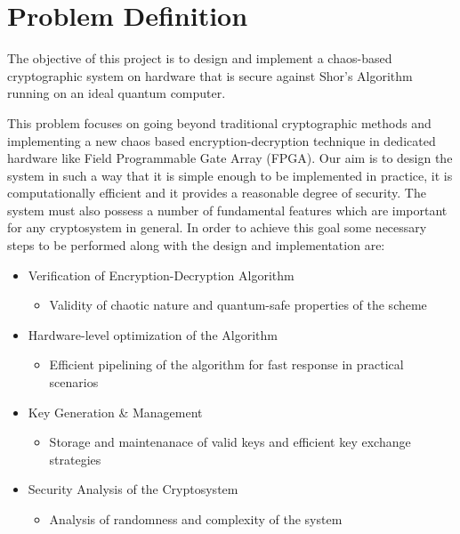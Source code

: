 \section{Problem Definition}
The objective of this project is to design and implement a chaos-based cryptographic system on hardware that is secure against Shor's Algorithm running on an ideal quantum computer.

This problem focuses on going beyond traditional cryptographic methods and implementing a new chaos based encryption-decryption technique in dedicated hardware like Field Programmable Gate Array (FPGA). Our aim is to design the system in such a way that it is simple enough to be implemented in practice, it is computationally efficient and it provides a reasonable degree of security. The system must also possess a number of fundamental features which are important for any cryptosystem in general. In order to achieve this goal some necessary steps to be performed along with the design and implementation are:
\begin{itemize}
  \item Verification of Encryption-Decryption Algorithm
    \begin{itemize}
        \item Validity of chaotic nature and quantum-safe properties of the scheme
    \end{itemize}

  \item Hardware-level optimization of the Algorithm
    \begin{itemize}
        \item Efficient pipelining of the algorithm for fast response in practical scenarios
    \end{itemize}
  \item Key Generation \& Management
    \begin{itemize}
        \item Storage and maintenanace of valid keys and efficient key exchange strategies
    \end{itemize}
  \item Security Analysis of the Cryptosystem
    \begin{itemize}
        \item Analysis of randomness and complexity of the system
    \end{itemize}
\end{itemize}
